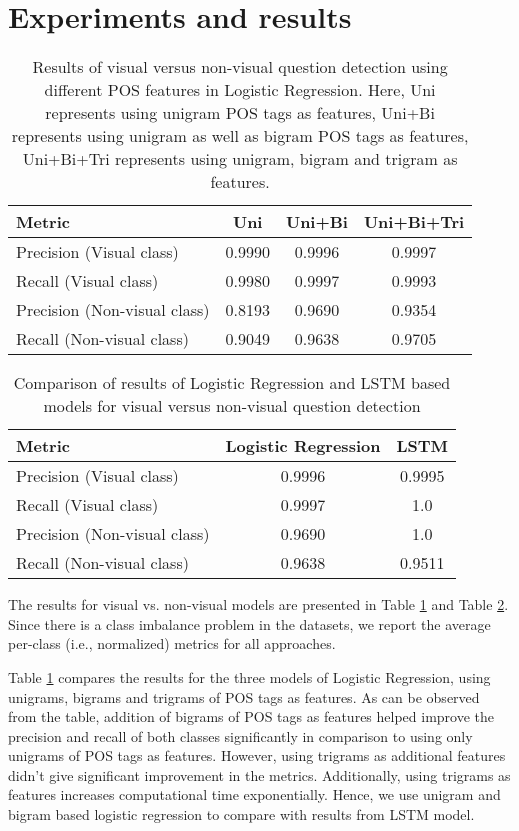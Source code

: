 \section{Experiments and results}
\begin{table}
  \caption{Results of visual versus non-visual question detection using different POS features in Logistic Regression. Here, Uni represents using unigram POS tags as features, Uni+Bi represents using unigram as well as bigram POS tags as features, Uni+Bi+Tri represents using unigram, bigram and trigram as features.}
  \label{tab:results_visual_lr}
  \begin{tabular}{lccc}
    \toprule
    Metric&Uni&Uni+Bi&Uni+Bi+Tri\\
    \midrule
    Precision (Visual class)&0.9990&0.9996&0.9997\\
    Recall (Visual class)&0.9980&0.9997&0.9993\\
    Precision (Non-visual class)&0.8193&0.9690&0.9354\\
    Recall (Non-visual class)&0.9049&0.9638&0.9705\\
  \bottomrule
\end{tabular}
\end{table}
\begin{table}
  \caption{Comparison of results of Logistic Regression and LSTM based models for visual versus non-visual question detection}
  \label{tab:results_visual}
  \begin{tabular}{lcc}
    \toprule
    Metric&Logistic Regression&LSTM\\
    \midrule
    Precision (Visual class)&0.9996&0.9995\\
    Recall (Visual class)&0.9997&1.0\\
    Precision (Non-visual class)&0.9690&1.0\\
    Recall (Non-visual class)&0.9638&0.9511\\
  \bottomrule
\end{tabular}
\end{table}
The results for visual vs. non-visual models are presented in Table \ref{tab:results_visual_lr} and Table \ref{tab:results_visual}. Since there is a class imbalance problem in the datasets, we report the average per-class (i.e., normalized) metrics for all approaches.

Table \ref{tab:results_visual_lr} compares the results for the three models of Logistic Regression, using unigrams, bigrams and trigrams of POS tags as features. As can be observed from the table, addition of bigrams of POS tags as features helped improve the precision and recall of both classes significantly in comparison to using only unigrams of POS tags as features. However, using trigrams as additional features didn't give significant improvement in the metrics. Additionally, using trigrams as features increases computational time exponentially. Hence, we use unigram and bigram based logistic regression to compare with results from LSTM model. 

